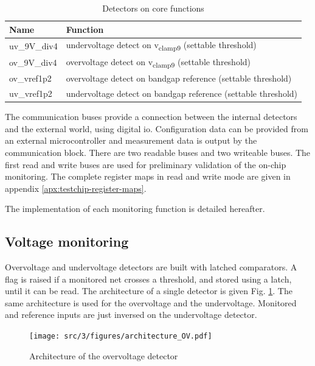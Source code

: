 \begin{table}[!htbp]
\centering
\begin{tabular}{@{}ll@{}}
\toprule
Name           & Function \\ \toprule
uv\_9V\_div4	 & undervoltage detect on v\textsubscript{clamp9} (settable threshold)\\
ov\_9V\_div4	 & overvoltage detect on v\textsubscript{clamp9} (settable threshold)\\
ov\_vref1p2	   & overvoltage detect on bandgap reference (settable threshold) \\
uv\_vref1p2	   & undervoltage detect on bandgap reference (settable threshold) \\
\bottomrule
\end{tabular}
\caption{Detectors on core functions}
\label{tab:detectors}
\end{table}

The communication buses provide a connection between the internal detectors and the external world, using digital \gls{io}.
Configuration data can be provided from an external microcontroller and measurement data is output by the communication block.
There are two readable buses and two writeable buses.
The first read and write buses are used for preliminary validation of the on-chip monitoring.
The complete register maps in read and write mode are given in appendix \ref{apx:testchip-register-maps}.

The implementation of each monitoring function is detailed hereafter.

\subsection{Voltage monitoring}

Overvoltage and undervoltage detectors are built with latched comparators.
A flag is raised if a monitored net crosses a threshold, and stored using a latch, until it can be read.
The architecture of a single detector is given Fig. \ref{fig:architecture-ov}.
The same architecture is used for the overvoltage and the undervoltage.
Monitored and reference inputs are just inversed on the undervoltage detector.

\begin{figure}[!h]
  \centering
  \texttt{[image: src/3/figures/architecture\_OV.pdf]}
  \caption{Architecture of the overvoltage detector}
  \label{fig:architecture-ov}
\end{figure}

